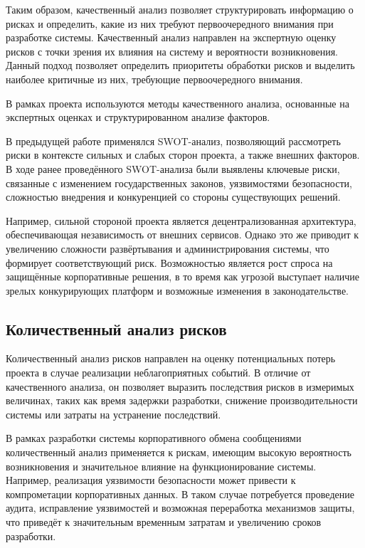 \documentclass[14pt,a4paper]{extarticle}
\begin{document}
Таким образом, качественный анализ позволяет структурировать информацию о рисках и определить, какие из них требуют первоочередного внимания при разработке системы.
Качественный анализ направлен на экспертную оценку рисков с точки зрения их влияния на систему и вероятности возникновения. Данный подход позволяет определить приоритеты обработки рисков и выделить наиболее критичные из них, требующие первоочередного внимания.

В рамках проекта используются методы качественного анализа, основанные на экспертных оценках и структурированном анализе факторов.

В предыдущей работе применялся SWOT-анализ, позволяющий рассмотреть риски в контексте сильных и слабых сторон проекта, а также внешних факторов. В ходе ранее проведённого SWOT-анализа были выявлены ключевые риски, связанные с изменением государственных законов, уязвимостями безопасности, сложностью внедрения и конкуренцией со стороны существующих решений.

Например, сильной стороной проекта является децентрализованная архитектура, обеспечивающая независимость от внешних сервисов. Однако это же приводит к увеличению сложности развёртывания и администрирования системы, что формирует соответствующий риск. Возможностью является рост спроса на защищённые корпоративные решения, в то время как угрозой выступает наличие зрелых конкурирующих платформ и возможные изменения в законодательстве.

\subsection{Количественный анализ рисков}

Количественный анализ рисков направлен на оценку потенциальных потерь проекта в случае реализации неблагоприятных событий. В отличие от качественного анализа, он позволяет выразить последствия рисков в измеримых величинах, таких как время задержки разработки, снижение производительности системы или затраты на устранение последствий.

В рамках разработки системы корпоративного обмена сообщениями количественный анализ применяется к рискам, имеющим высокую вероятность возникновения и значительное влияние на функционирование системы. Например, реализация уязвимости безопасности может привести к компрометации корпоративных данных. В таком случае потребуется проведение аудита, исправление уязвимостей и возможная переработка механизмов защиты, что приведёт к значительным временным затратам и увеличению сроков разработки.
\end{document}
